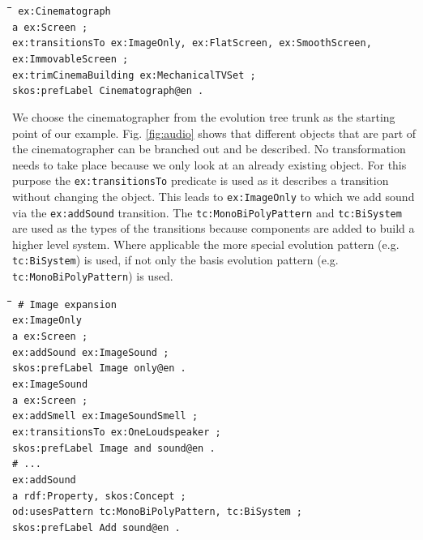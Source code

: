 \documentclass[11pt,a4paper]{article}
\newenvironment{code}{\tt \begin{tabbing}
\hskip12pt\=\hskip12pt\=\hskip12pt\=\hskip12pt\=\hskip5cm\=\hskip5cm\=\kill}
{\end{tabbing}}
\def\dq{{\char34}}
\begin{document}
\begin{code}\tt
ex:Cinematograph \\
\> a ex:Screen ; \\
\> ex:transitionsTo ex:ImageOnly, ex:FlatScreen, ex:SmoothScreen,\\\>\>
ex:ImmovableScreen ;\\ 
\> ex:trimCinemaBuilding ex:MechanicalTVSet ;\\
\> skos:prefLabel {\dq}Cinematograph{\dq}@en .
\end{code}

We choose the cinematographer from the evolution tree trunk as the starting
point of our example. Fig. \ref{fig:audio} shows that different objects that
are part of the cinematographer can be branched out and be described. No
transformation needs to take place because we only look at an already existing
object. For this purpose the \texttt{ex:transitionsTo} predicate is used as it
describes a transition without changing the object. This leads to
\texttt{ex:ImageOnly} to which we add sound via the \texttt{ex:addSound}
transition. The \texttt{tc:MonoBiPolyPattern} and \texttt{tc:BiSystem} are
used as the types of the transitions because components are added to build a
higher level system. Where applicable the more special evolution pattern
(e.g. \texttt{tc:BiSystem}) is used, if not only the basis evolution pattern
(e.g. \texttt{tc:MonoBiPolyPattern}) is used.

\begin{code}\tt
\# Image expansion\\[4pt]
ex:ImageOnly\\
\> a ex:Screen ;\\
\> ex:addSound ex:ImageSound ;\\
\> skos:prefLabel {\dq}Image only{\dq}@en .\\[4pt]
ex:ImageSound \\
\> a ex:Screen ; \\
\> ex:addSmell ex:ImageSoundSmell ;\\
\> ex:transitionsTo ex:OneLoudspeaker ;\\
\> skos:prefLabel {\dq}Image and sound{\dq}@en .\\[4pt]
\# ...\\[4pt]
ex:addSound\\
\> a rdf:Property, skos:Concept ;\\
\> od:usesPattern tc:MonoBiPolyPattern, tc:BiSystem ;\\
\> skos:prefLabel {\dq}Add sound{\dq}@en .
\end{code}
\end{document}

